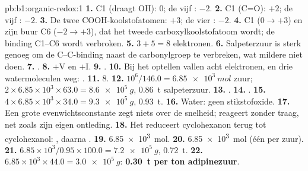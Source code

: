\begin{solution}{pb:b1:organic-redox:1}
\textbf{1.} C1 (draagt OH): 0; de vijf : $-2$.
\textbf{2.} C1 (C=O): $+2$; de vijf : $-2$.
\textbf{3.} De twee COOH-koolstofatomen: $+3$; de vier : $-2$.
\textbf{4.} C1 ($0 \to +3$) en zijn buur C6 ($-2 \to +3$), dat het tweede
carboxylkoolstofatoom wordt; de binding C1--C6 wordt verbroken.
\textbf{5.} $3 + 5 = 8$ elektronen.
\textbf{6.} Salpeterzuur is sterk genoeg om de C--C-binding naast de
carbonylgroep te verbreken, wat mildere  niet doen.
\textbf{7.} .
\textbf{8.} $+$V en $+$I.
\textbf{9.} .
\textbf{10.} Bij het optellen vallen acht elektronen,  en drie
watermoleculen weg: .
\textbf{11.} 8.
\textbf{12.} $10^6/146.0 = \qty{6.85e3}{mol}$ zuur; $2 \times 6.85 \times
10^3 \times 63.0 = \qty{8.6e5}{g}$, \qty{0.86}{t} salpeterzuur.
\textbf{13.} .
\textbf{14.} .
\textbf{15.} $4 \times 6.85 \times 10^3 \times 34.0 = \qty{9.3e5}{g}$,
\qty{0.93}{t}.
\textbf{16.} Water: geen stikstofoxide.
\textbf{17.} Een grote evenwichtsconstante zegt niets over de snelheid;
 reageert zonder  traag, net zoals zijn eigen
ontleding.
\textbf{18.} Het reduceert cyclohexanon terug tot cyclohexanol:
, daarna
.
\textbf{19.} \qty{6.85e3}{mol}.
\textbf{20.} \qty{6.85e3}{mol}  (één per zuur).
\textbf{21.} $6.85 \times 10^3/0.95 \times 100.0 = \qty{7.2e5}{g}$, \qty{0.72}{t}.
\textbf{22.} $6.85 \times 10^3 \times 44.0 = \qty{3.0e5}{g}$: \textbf{\qty{0.30}{t}
 per ton adipinezuur}.
\end{solution}
